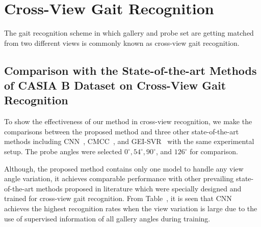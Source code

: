 \section{Cross-View Gait Recognition}
The gait recognition scheme in which gallery and probe set are getting matched from two different views is commonly known as cross-view gait recognition.

\subsection{Comparison with the State-of-the-art Methods of CASIA B Dataset on Cross-View Gait Recognition}
To show the effectiveness of our method in cross-view recognition, we make the comparisons between the proposed method and three other state-of-the-art methods including CNN~\cite{Wu_17}, CMCC~\cite{Kusakunniran_14}, and GEI-SVR~\cite{Kusakunniran_10} with the same experimental setup. The probe angles were selected $0^{\circ}, 54^{\circ}, 90^{\circ}$, and $126^{\circ}$ for comparison. 

Although, the proposed method contains only one model to handle any view angle variation, it achieves comparable performance with other prevailing state-of-the-art methods proposed in literature which were specially designed and trained for cross-view gait recognition. From Table~\cite{table:comp_casia_b_cross_view}, it is seen that CNN~\cite{Wu_17} achieves the highest recognition rates when the view variation is large due to the use of supervised information of all gallery angles during training.


